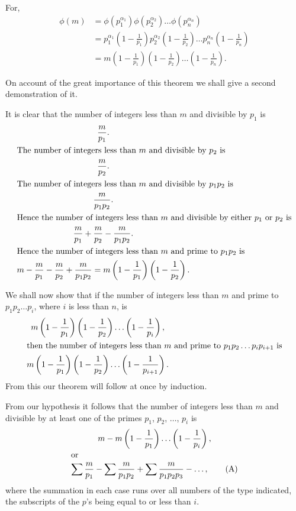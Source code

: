 \documentclass[oneside]{book}
\begin{document}
For,
\begin{align*}
\phi(m) &= \phi(p_1^{\alpha_1}) \phi(p_2^{\alpha_2}) \ldots
             \phi(p_n^{\alpha_n}) \\
        &= p_1^{\alpha_1} \left ( 1-\frac{1}{p_1} \right )
             p_2^{\alpha_2} \left ( 1-\frac{1}{p_2} \right )
             \ldots
             p_n^{\alpha_n} \left ( 1-\frac{1}{p_n} \right ) \\
        &= m \left ( 1-\frac{1}{p_1} \right )
             \left ( 1-\frac{1}{p_2} \right )
             \ldots
             \left ( 1-\frac{1}{p_n} \right ).
\end{align*}

On account of the great importance of this theorem we shall give a
second demonstration of it.

It is clear that the number of integers less than $m$ and divisible
by $p_1$ is
\begin{gather*}
\frac{m}{p_1}. \\
\intertext{The number of integers less than $m$ and divisible by
$p_2$ is}
\frac{m}{p_2}. \\
\intertext{The number of integers less than $m$ and divisible by
$p_1 p_2$ is}
\frac{m}{p_1 p_2}. \\
\intertext{Hence the number of integers less than $m$ and divisible
by either $p_1$ or $p_2$ is}
\frac{m}{p_1} + \frac{m}{p_2} - \frac{m}{p_1 p_2}. \\
\intertext{Hence the number of integers less than $m$ and prime to
$p_1 p_2$ is}
m - \frac{m}{p_1} - \frac{m}{p_2} + \frac{m}{p_1 p_2} =
   m \left ( 1-\frac{1}{p_1} \right ) \left ( 1-\frac{1}{p_2} \right ).
\end{gather*}

We shall now show that if the number of integers less than $m$ and
prime to $p_1 p_2 \ldots p_i$, where $i$ is less than $n$, is
\begin{gather*}
m \left ( 1-\frac{1}{p_1} \right )
  \left ( 1-\frac{1}{p_2} \right )
  \ldots
  \left ( 1-\frac{1}{p_i} \right ), \\
\intertext{then the number of integers less than $m$ and prime to
$p_1 p_2 \ldots p_i p_{i+1}$ is}
   m \left ( 1-\frac{1}{p_1} \right )
     \left ( 1-\frac{1}{p_2} \right )
     \ldots
     \left ( 1-\frac{1}{p_{i+1}} \right ).
\end{gather*}
From this our theorem will follow at once by induction.

From our hypothesis it follows that the number of integers less than
$m$ and divisible by at least one of the primes $p_1$, $p_2$,
$\ldots$, $p_i$ is
\begin{gather}
m -
   m \left (1 - \frac{1}{p_1}\right )
   \ldots
   \left (1 - \frac{1}{p_i}\right ), \notag \\
\intertext{or}
\sum \frac{m}{p_1} - \sum \frac{m}{p_1p_2}
   + \sum \frac{m}{p_1p_2p_3} - \ldots, \tag{A}
\end{gather}
where the summation in each case runs over all numbers of the type
indicated, the subscripts of the $p$'s being equal to or less than
$i$.
\end{document}
